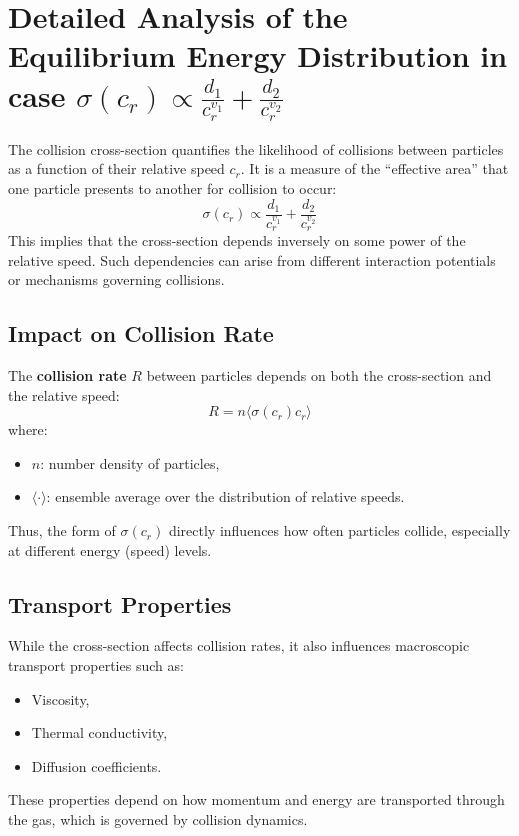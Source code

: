 \section{Detailed Analysis of the Equilibrium Energy Distribution in case $\sigma(c_r) \propto \frac{d_1}{c_r^{v_1}} + \frac{d_2}{c_r^{v_2}}$} 

The collision cross-section quantifies the likelihood of collisions between particles as a function of their relative speed \(c_r\). It is a measure of the ``effective area'' that one particle presents to another for collision to occur:
\[
\sigma(c_r) \propto \frac{d_1}{c_r^{v_1}} + \frac{d_2}{c_r^{v_2}}
\]
This implies that the cross-section depends inversely on some power of the relative speed. Such dependencies can arise from different interaction potentials or mechanisms governing collisions.

\subsection{Impact on Collision Rate}
The \textbf{collision rate} \(R\) between particles depends on both the cross-section and the relative speed:
\[
R = n \langle \sigma(c_r) c_r \rangle
\]
where:
\begin{itemize}
    \item \(n\): number density of particles,
    \item \(\langle \cdot \rangle\): ensemble average over the distribution of relative speeds.
\end{itemize}
Thus, the form of \(\sigma(c_r)\) directly influences how often particles collide, especially at different energy (speed) levels.

\subsection{Transport Properties}
While the cross-section affects collision rates, it also influences macroscopic transport properties such as:
\begin{itemize}
    \item Viscosity,
    \item Thermal conductivity,
    \item Diffusion coefficients.
\end{itemize}
These properties depend on how momentum and energy are transported through the gas, which is governed by collision dynamics.



